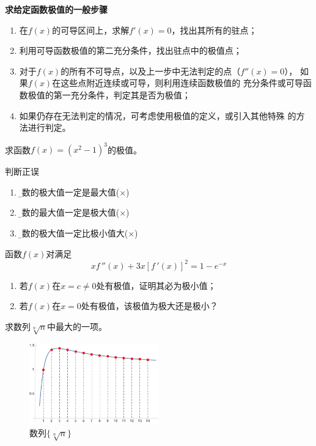 \begin{thx}
	{\bf 求给定函数极值的一般步骤}
	\begin{enumerate}[(1)]
	  \item 在$f(x)$的可导区间上，求解$f'(x)=0$，找出其所有的驻点；
	  \item 利用可导函数极值的第二充分条件，找出驻点中的极值点；
	  \item 对于$f(x)$的所有不可导点，以及上一步中无法判定的点（$f''(x)=0$），
	  如果$f(x)$在这些点附近连续或可导，则利用连续函数极值的
	  充分条件或可导函数极值的第一充分条件，判定其是否为极值；
	  \item 如果仍存在无法判定的情况，可考虑使用极值的定义，或引入其他特殊
	  的方法进行判定。	  
	\end{enumerate}
\end{thx}

\egz 求函数$f(x)=(x^2-1)^3$的极值。

\egz 判断正误
\begin{enumerate}[(1)]
  \setlength{\itemindent}{1cm}
  \item {\b 函数的极大值一定是最大值\quad  ({$\times$})} 
  \item {\b 函数的最大值一定是极大值\quad  ({$\times$})} 
  \item {\b 函数的极大值一定比极小值大\quad  ({$\times$})} 
\end{enumerate}

\egz 函数$f(x)$对满足
$$xf\,''(x)+3x[f\,'(x)]^2=1-e^{-x}$$
\begin{enumerate}[(1)]
  \setlength{\itemindent}{1cm}
  \item 若$f(x)$在$x=c\ne 0$处有极值，证明其必为极小值；
  \item 若$f(x)$在$x=0$处有极值，该极值为极大还是极小？
\end{enumerate}

\egz 求数列$\sqrt[n]n$中最大的一项。

\begin{figure}[h]
	\centering
	\includegraphics[width=0.5\textwidth]
	{./Images/Ch03/x1x.pdf}
	\caption{数列$\{\sqrt[n]n\}$}
	\label{fig:x1xn1n}
\end{figure}

